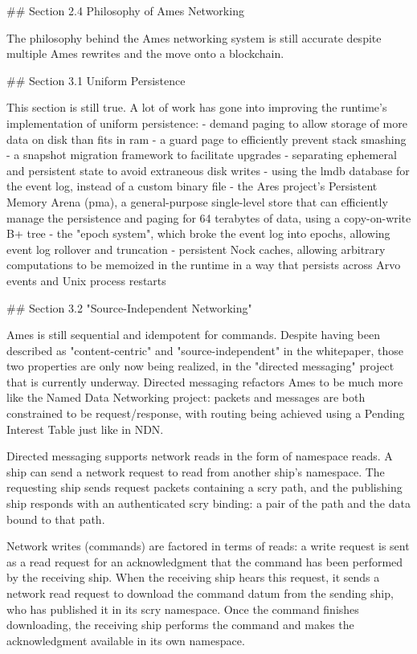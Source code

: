\documentclass[twoside]{article}
\begin{document}
## Section 2.4 Philosophy of Ames Networking

The philosophy behind the Ames networking system is still accurate despite multiple Ames rewrites and the move onto a blockchain.

## Section 3.1 Uniform Persistence

This section is still true.  A lot of work has gone into improving the runtime's implementation of uniform persistence:
- demand paging to allow storage of more data on disk than fits in {\sc ram}
- a guard page to efficiently prevent stack smashing
- a snapshot migration framework to facilitate upgrades
- separating ephemeral and persistent state to avoid extraneous disk writes
- using the {\sc lmdb} database for the event log, instead of a custom binary file
- the Ares project's Persistent Memory Arena ({\sc pma}), a general-purpose single-level store that can efficiently manage the persistence and paging for 64 terabytes of data, using a copy-on-write B+ tree
- the "epoch system", which broke the event log into epochs, allowing event log rollover and truncation
- persistent Nock caches, allowing arbitrary computations to be memoized in the runtime in a way that persists across Arvo events and Unix process restarts

## Section 3.2 "Source-Independent Networking"

Ames is still sequential and idempotent for commands.  Despite having been described as "content-centric" and "source-independent" in the whitepaper, those two properties are only now being realized, in the "directed messaging" project that is currently underway.  Directed messaging refactors Ames to be much more like the Named Data Networking project: packets and messages are both constrained to be request/response, with routing being achieved using a Pending Interest Table just like in NDN.

Directed messaging supports network reads in the form of namespace reads.  A ship can send a network request to read from another ship's namespace.  The requesting ship sends request packets containing a scry path, and the publishing ship responds with an authenticated scry binding: a pair of the path and the data bound to that path. 

Network writes (commands) are factored in terms of reads: a write request is sent as a read request for an acknowledgment that the command has been performed by the receiving ship.  When the receiving ship hears this request, it sends a network read request to download the command datum from the sending ship, who has published it in its scry namespace.  Once the command finishes downloading, the receiving ship performs the command and makes the acknowledgment available in its own namespace.
\end{document}
